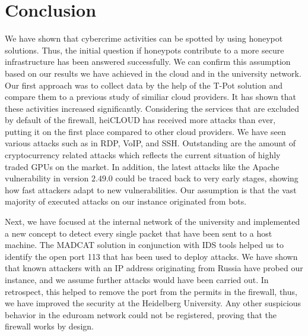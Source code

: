 \chapter{Conclusion}

We have shown that cybercrime activities can be spotted by using honeypot solutions.
Thus, the initial question if honeypots contribute to a more secure infrastructure has been answered successfully.
We can confirm this assumption based on our results we have achieved in the cloud and in the university network.
Our first approach was to collect data by the help of the T-Pot solution and compare them to a previous study of similiar cloud providers.
It has shown that these activities increased significantly.
Considering the services that are excluded by default of the firewall, heiCLOUD has received more attacks than ever, putting it on the first place compared to other cloud providers.
We have seen various attacks such as in RDP, VoIP, and SSH.
Outstanding are the amount of cryptocurrency related attacks which reflects the current situation of highly traded GPUs on the market.
In addition, the latest attacks like the Apache vulnerability in version $2.49.0$ could be traced back to very early stages, showing how fast attackers adapt to new vulnerabilities.
Our assumption is that the vast majority of executed attacks on our instance originated from bots.

Next, we have focused at the internal network of the university and implemented a new concept to detect every single packet that have been sent to a host machine.
The MADCAT solution in conjunction with IDS tools helped us to identify the open port 113 that has been used to deploy attacks.
We have shown that known attackers with an IP address originating from Russia have probed our instance, and we assume further attacks would have been carried out.
In retrospect, this helped to remove the port from the permits in the firewall, thus, we have improved the security at the Heidelberg University.
Any other suspicious behavior in the eduroam network could not be registered, proving that the firewall works by design.

